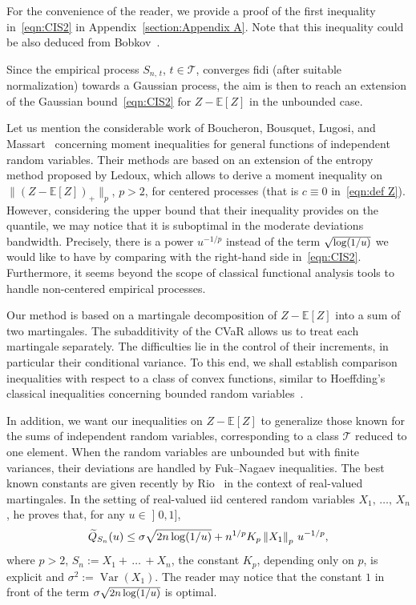 \documentclass[AHL,Unicode,longabstracts,published]{cedram}
\DeclareMathOperator{\Var}{Var}
\newcommand{\bE}{\mathbb{E}}
\newcommand{\cT}{\mathcal{T}}
\newcommand{\intervalleof}[2]{\mathopen{]} #1\mathclose{}\mathpunct{},#2\mathclose{]}}
\let\oldtilde\tilde
\renewcommand*{\tilde}[1]{\mathchoice{\widetilde{#1}}{\widetilde{#1}}{\oldtilde{#1}}{\oldtilde{#1}}}
\begin{document}
For the convenience of the reader, we provide a proof of the first inequality in~\eqref{eqn:CIS2} in Appendix~\ref{section:Appendix A}. Note that this inequality could be also deduced from Bobkov~\cite[Corollary~2]{Bobkov03}.

Since the empirical process $S_{n,\,t}$, $t\in\cT$, converges fidi (after suitable normalization) towards a Gaussian process, the aim is then to reach an extension of the Gaussian bound~\eqref{eqn:CIS2} for $Z-\bE[Z]$ in the unbounded case.

Let us mention the considerable work of Boucheron, Bousquet, Lugosi, and Massart~\cite{BBLM05} concerning moment inequalities for general functions of independent random variables. Their methods are based on an extension of the entropy method proposed by Ledoux, which allows to derive a moment inequality on $\|(Z-\bE[Z])_+\|_p$, $p>2$, for centered processes (that is $c\equiv 0$ in~\eqref{eqn:def Z}). However, considering the upper bound that their inequality provides on the quantile, we may notice that it is suboptimal in the moderate deviations bandwidth. Precisely, there is a power $u^{-1/p}$ instead of the term $\sqrt{\text{\small{$\log(1/u)$}}}$ we would like to have by comparing with the right-hand side in~\eqref{eqn:CIS2}. Furthermore, it seems beyond the scope of classical functional analysis tools to handle non-centered empirical processes.

Our method is based on a martingale decomposition of $Z-\bE[Z]$ into a sum of two martingales. The subadditivity of the CVaR allows us to treat each martingale separately. The difficulties lie in the control of their increments, in particular their conditional variance. To this end, we shall establish comparison inequalities with respect to a class of convex functions, similar to Hoeffding's classical inequalities concerning bounded random variables~\cite{Hoeffding63}.

In addition, we want our inequalities on $Z-\bE[Z]$ to generalize those known for the sums of independent random variables, corresponding to a class $\cT$ reduced to one element. When the random variables are unbounded but with finite variances, their deviations are handled by Fuk--Nagaev inequalities. The best known constants are given recently by Rio~\cite{Rio17a} in the context of real-valued martingales. In the setting of real-valued iid centered random variables $X_1,\,\ldots,\,X_n$, he proves that, for any $u\in\intervalleof 01$,
\begin{equation}\label{eqn:Rio FukNagaev iid}
\tilde Q_{S_n}(u)\leq \sigma\sqrt{2n\log(1/u)}+n^{1/p}K_p \left\|X_1\right\|_{p} \,u^{-1/p},
\end{equation}
where $p>2$, $S_n:=X_1+\,\ldots\,+X_n$, the constant $K_p$, depending only on $p$, is explicit and $\sigma^2:=\Var(X_1)$. The reader may notice that the constant $1$ in front of the term $\sigma\sqrt{\text{\small{$2n\log(1/u)$}}}$ is optimal.
\end{document}
